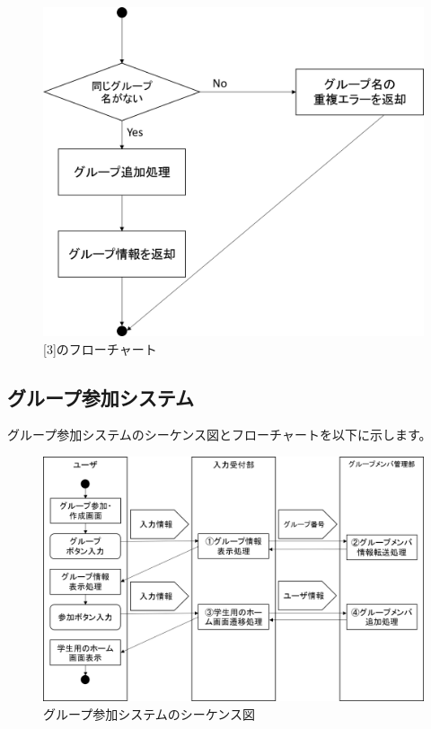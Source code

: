\begin{figure}[htbp]
  \begin{center}
    \includegraphics[width=0.75\linewidth,clip]{./img/create_group/sub3.png}
    \caption{[3]のフローチャート}\label{fig:creategroupflow1}
  \end{center}
\end{figure}

\newpage
\subsection{グループ参加システム}
グループ参加システムのシーケンス図とフローチャートを以下に示します。

\begin{figure}[htbp]
  \begin{center}
    \includegraphics[width=1\linewidth,clip]{./img/join_group/main.png}
    \caption{グループ参加システムのシーケンス図}\label{fig:joingroupseaquence}
  \end{center}
\end{figure}

